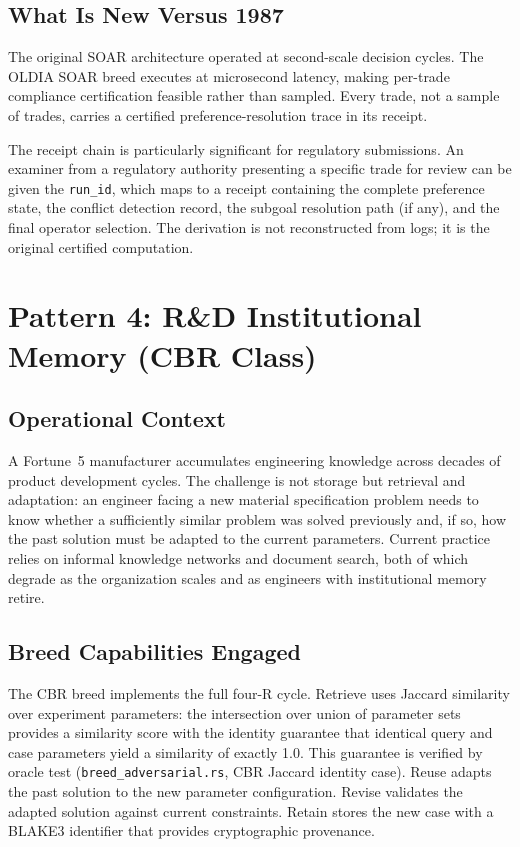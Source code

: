 \subsection*{What Is New Versus 1987}

The original SOAR architecture operated at second-scale decision cycles. The OLDIA
SOAR breed executes at microsecond latency, making per-trade compliance certification
feasible rather than sampled. Every trade, not a sample of trades, carries a certified
preference-resolution trace in its receipt.

The receipt chain is particularly significant for regulatory submissions. An examiner
from a regulatory authority presenting a specific trade for review can be given the
\texttt{run\_id}, which maps to a receipt containing the complete preference state,
the conflict detection record, the subgoal resolution path (if any), and the final
operator selection. The derivation is not reconstructed from logs; it is the original
certified computation.

\section{Pattern 4: R\&D Institutional Memory (CBR Class)}
\label{sec:cbr-deployment}

\subsection*{Operational Context}

A Fortune~5 manufacturer accumulates engineering knowledge across decades of product
development cycles. The challenge is not storage but retrieval and adaptation: an
engineer facing a new material specification problem needs to know whether a
sufficiently similar problem was solved previously and, if so, how the past solution
must be adapted to the current parameters. Current practice relies on informal
knowledge networks and document search, both of which degrade as the organization
scales and as engineers with institutional memory retire.

\subsection*{Breed Capabilities Engaged}

The CBR breed implements the full four-R cycle. Retrieve uses Jaccard similarity
over experiment parameters: the intersection over union of parameter sets provides
a similarity score with the identity guarantee that identical query and case
parameters yield a similarity of exactly 1.0. This guarantee is verified by oracle
test (\texttt{breed\_adversarial.rs}, CBR Jaccard identity case). Reuse adapts the
past solution to the new parameter configuration. Revise validates the adapted
solution against current constraints. Retain stores the new case with a BLAKE3
identifier that provides cryptographic provenance.

